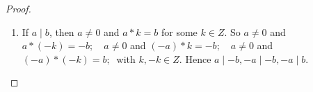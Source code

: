 \documentclass[11pt]{amsbook}
\begin{document}
\begin{proof}
\begin{enumerate}[label={\arabic*.}]
\item
If $a \mid b$, then $a \neq 0$ and $a*k = b$ for some $k \in Z$. So $a \neq 0$ and $a*(-k) = -b; \quad a \neq 0$ and $(-a)*k = -b; \quad a \neq 0$ and $(-a)*(-k) = b; \:$ with $k, -k \in Z$. Hence $a \mid -b, -a \mid -b, -a \mid b.$
\end{enumerate}
\end{proof}

\end{document}
